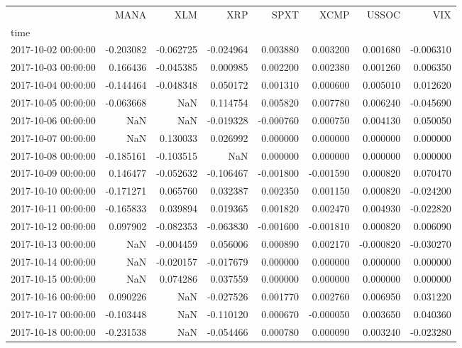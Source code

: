 \begin{tabular}{lrrrrrrr}
\toprule
 & MANA & XLM & XRP & SPXT & XCMP & USSOC & VIX \\
time &  &  &  &  &  &  &  \\
\midrule
2017-10-02 00:00:00 & -0.203082 & -0.062725 & -0.024964 & 0.003880 & 0.003200 & 0.001680 & -0.006310 \\
2017-10-03 00:00:00 & 0.166436 & -0.045385 & 0.000985 & 0.002200 & 0.002380 & 0.001260 & 0.006350 \\
2017-10-04 00:00:00 & -0.144464 & -0.048348 & 0.050172 & 0.001310 & 0.000600 & 0.005010 & 0.012620 \\
2017-10-05 00:00:00 & -0.063668 & NaN & 0.114754 & 0.005820 & 0.007780 & 0.006240 & -0.045690 \\
2017-10-06 00:00:00 & NaN & NaN & -0.019328 & -0.000760 & 0.000750 & 0.004130 & 0.050050 \\
2017-10-07 00:00:00 & NaN & 0.130033 & 0.026992 & 0.000000 & 0.000000 & 0.000000 & 0.000000 \\
2017-10-08 00:00:00 & -0.185161 & -0.103515 & NaN & 0.000000 & 0.000000 & 0.000000 & 0.000000 \\
2017-10-09 00:00:00 & 0.146477 & -0.052632 & -0.106467 & -0.001800 & -0.001590 & 0.000820 & 0.070470 \\
2017-10-10 00:00:00 & -0.171271 & 0.065760 & 0.032387 & 0.002350 & 0.001150 & 0.000820 & -0.024200 \\
2017-10-11 00:00:00 & -0.165833 & 0.039894 & 0.019365 & 0.001820 & 0.002470 & 0.004930 & -0.022820 \\
2017-10-12 00:00:00 & 0.097902 & -0.082353 & -0.063830 & -0.001600 & -0.001810 & 0.000820 & 0.006090 \\
2017-10-13 00:00:00 & NaN & -0.004459 & 0.056006 & 0.000890 & 0.002170 & -0.000820 & -0.030270 \\
2017-10-14 00:00:00 & NaN & -0.020157 & -0.017679 & 0.000000 & 0.000000 & 0.000000 & 0.000000 \\
2017-10-15 00:00:00 & NaN & 0.074286 & 0.037559 & 0.000000 & 0.000000 & 0.000000 & 0.000000 \\
2017-10-16 00:00:00 & 0.090226 & NaN & -0.027526 & 0.001770 & 0.002760 & 0.006950 & 0.031220 \\
2017-10-17 00:00:00 & -0.103448 & NaN & -0.110120 & 0.000670 & -0.000050 & 0.003650 & 0.040360 \\
2017-10-18 00:00:00 & -0.231538 & NaN & -0.054466 & 0.000780 & 0.000090 & 0.003240 & -0.023280 \\

\end{tabular}
